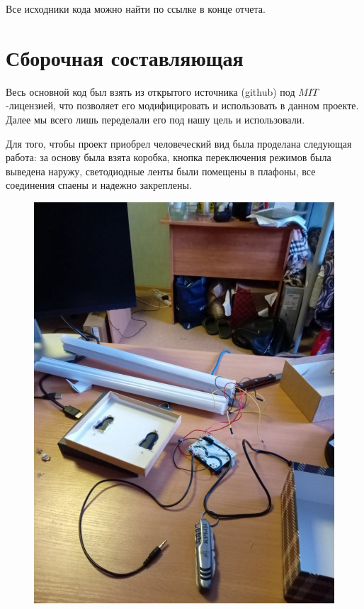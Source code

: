 \documentclass[a4paper, 12pt]{article}%
\begin{document}
Все исходники кода можно найти по ссылке в конце отчета.

\section{Сборочная составляющая}

Весь основной код был взять из открытого источника (github) под $MIT$-лицензией, что позволяет его модифицировать и использовать в данном проекте. Далее мы всего лишь переделали его под нашу цель и использовали.

Для того, чтобы проект приобрел человеческий вид была проделана следующая работа: за основу была взята коробка, кнопка переключения режимов была выведена наружу, светодиодные ленты были помещены в плафоны, все соединения спаены и надежно закреплены.

\newpage

\begin{figure}[!h]
\begin{center}
\includegraphics[scale=0.4]{pictures/work1.png}
\end{center}
\end{figure}
\end{document}
